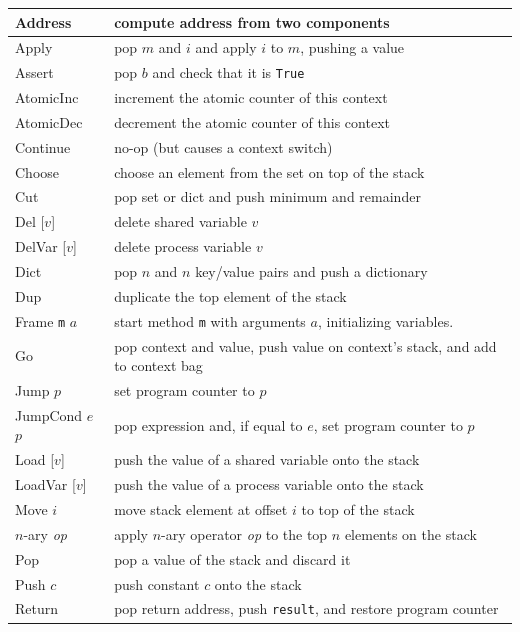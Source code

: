 \documentclass{report}
\begin{document}
{\small
\begin{tabular}{|l|l|}
\hline
Address & compute address from two components \\
\hline
Apply & pop $m$ and $i$ and apply $i$ to $m$, pushing a value \\
\hline
Assert & pop $b$ and check that it is \texttt{True} \\
\hline
AtomicInc & increment the atomic counter of this context \\
\hline
AtomicDec & decrement the atomic counter of this context \\
\hline
Continue & no-op (but causes a context switch) \\
\hline
Choose & choose an element from the set on top of the stack \\
\hline
Cut & pop set or dict and push minimum and remainder \\
\hline
Del [$v$] & delete shared variable $v$ \\
\hline
DelVar [$v$] & delete process variable $v$ \\
\hline
Dict & pop $n$ and $n$ key/value pairs and push a dictionary \\
\hline
Dup & duplicate the top element of the stack \\
\hline
Frame \texttt{m} $a$ & start method \texttt{m} with arguments $a$,
initializing variables.  \\
\hline
Go & pop context and value, push value on context's stack, and add to context bag \\
\hline
Jump $p$ & set program counter to $p$ \\
\hline
JumpCond $e$ $p$ & pop expression and, if equal to $e$, set program counter to $p$ \\
\hline
Load [$v$] & push the value of a shared variable onto the stack \\
\hline
LoadVar [$v$] & push the value of a process variable onto the stack \\
\hline
Move $i$ & move stack element at offset $i$ to top of the stack \\
\hline
$n$-ary \textit{op} & apply $n$-ary operator \textit{op} to the top $n$ elements on the stack \\
\hline
Pop & pop a value of the stack and discard it \\
\hline
Push $c$ & push constant $c$ onto the stack \\
\hline
Return & pop return address, push \texttt{result}, and restore program counter \\
\hline

\end{tabular}}
\end{document}
